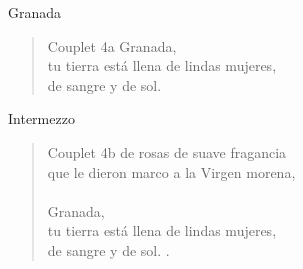 \begin{song}[vals]{Granada}
\begin{verse}{Couplet 4a}
Granada,\\
\chord{\_\_\_\_\_\_\_\_\_\_\_\_}tu tierra está llena de lindas mujeres,\\
de sangre y de sol.\\
\end{verse}

\begin{instrumental}{Intermezzo}
\measure*{}\measure{}\measure{}
\end{instrumental}

\begin{verse}{Couplet 4b}
de rosas de suave fragancia\\
que le dieron marco a la Virgen morena, \hspace{2em} \\\\
Granada,\\
\chord{\_\_\_\_\_\_\_\_\_\_\_\_}tu tierra está llena de lindas mujeres,\\
de sangre y de sol.  \hspace{2em} \hspace{2em} \hspace{2em} .\\
\end{verse}
\clearpage

\end{song}

